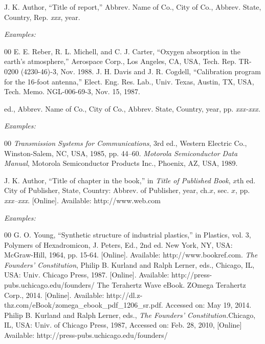 \documentclass{ieeetj}
\begin{document}

\noindent J. K. Author, ``Title of report,'' Abbrev. Name of Co., City of Co., Abbrev.
State, Country, Rep. {\it xxx}, year.

{\it Examples:}

\begin{thebibliography}{00}
 E. E. Reber, R. L. Michell, and C. J. Carter, ``Oxygen absorption in the earth's atmosphere,'' Aerospace Corp., Los Angeles, CA, USA, Tech. Rep. TR-0200 (4230-46)-3, Nov. 1988.
 J. H. Davis and J. R. Cogdell, ``Calibration program for the 16-foot antenna,'' Elect. Eng. Res. Lab., Univ. Texas, Austin, TX, USA, Tech. Memo. NGL-006-69-3, Nov. 15, 1987.
\end{thebibliography}


 ed., Abbrev. Name of Co., City of Co., Abbrev. State, Country, year, pp.
{\it xxx-xxx.}

{\it Examples:}

\begin{thebibliography}{00}
 {\it Transmission Systems for Communications}, 3rd ed., Western Electric Co., Winston-Salem, NC, USA, 1985, pp. 44--60.
 {\it Motorola Semiconductor Data Manual}, Motorola Semiconductor Products Inc., Phoenix, AZ, USA, 1989.
\end{thebibliography}


\noindent J. K. Author, ``Title of chapter in the book,'' in {\it Title of Published Book}, $x$th ed. City of
Publisher, State, Country: Abbrev. of Publisher, year, ch.$x$, sec. $x$, pp.
{\it xxx--xxx}. [Online]. Available:  {http://www.web.com}




{\it Examples:}

\begin{thebibliography}{00}
 G. O. Young, ``Synthetic structure of industrial plastics,'' in Plastics, vol. 3, Polymers of Hexadromicon, J. Peters, Ed., 2nd ed. New York, NY, USA: McGraw-Hill, 1964, pp. 15-64. [Online]. Available:  {http://www.bookref.com}.
 {\it The Founders' Constitution}, Philip B. Kurland and Ralph Lerner, eds., Chicago, IL, USA: Univ. Chicago Press, 1987. [Online]. Available:  {http://press-pubs.uchicago.edu/founders/}
 The Terahertz Wave eBook. ZOmega Terahertz Corp., 2014. [Online]. Available:  {http://dl.z-thz.com/eBook/zomega\_ebook\_pdf\_1206\_sr.pdf}. Accessed on: May 19, 2014.
 Philip B. Kurland and Ralph Lerner, eds., {\it The Founders' Constitution.}Chicago, IL, USA: Univ. of Chicago Press, 1987, Accessed on: Feb. 28, 2010, [Online] Available:  {http://press-pubs.uchicago.edu/founders/}
\end{thebibliography}
\end{document}

